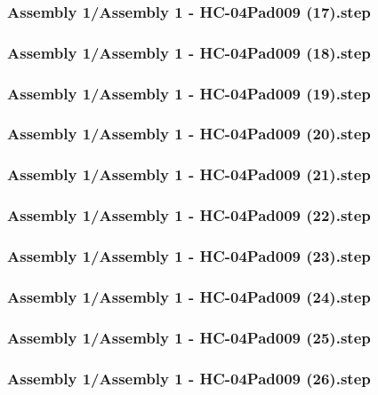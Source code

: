 \documentclass[a4paper,12pt]{article}
\begin{document}
\begin{lstlising}[language=C++]
\subsubsection{Assembly 1/Assembly 1 - HC-04Pad009 (17).step}

\subsubsection{Assembly 1/Assembly 1 - HC-04Pad009 (18).step}

\subsubsection{Assembly 1/Assembly 1 - HC-04Pad009 (19).step}

\subsubsection{Assembly 1/Assembly 1 - HC-04Pad009 (20).step}

\subsubsection{Assembly 1/Assembly 1 - HC-04Pad009 (21).step}

\subsubsection{Assembly 1/Assembly 1 - HC-04Pad009 (22).step}

\subsubsection{Assembly 1/Assembly 1 - HC-04Pad009 (23).step}

\subsubsection{Assembly 1/Assembly 1 - HC-04Pad009 (24).step}

\subsubsection{Assembly 1/Assembly 1 - HC-04Pad009 (25).step}

\subsubsection{Assembly 1/Assembly 1 - HC-04Pad009 (26).step}


\end{lstlising}
\end{document}
